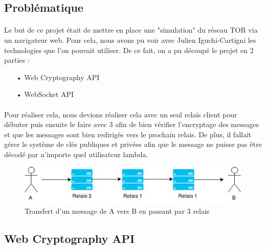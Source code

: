 \documentclass[a4paper,12pt]{report}
\begin{document}
	\subsection{Problématique}
	\paragraph*{}
	Le but de ce projet était de mettre en place une "simulation" du réseau TOR via un navigateur web. Pour cela, nous avons pu voir avec Julien Iguchi-Cartigni les technologies que l'on pouvait utiliser. De ce fait, on a pu découpé le projet en 2 parties : 
	\begin{itemize}
		\item[•] Web Cryptography API
		\item[•] WebSocket API
	\end{itemize}
	\paragraph*{}
	Pour réaliser cela, nous devions réaliser cela avec un seul relais client pour débuter puis ensuite le faire avec 3 afin de bien vérifier l'encryptage des messages et que les messages sont bien redirigés vers le prochain relais. De plus, il fallait gérer le système de clés publiques et privées afin que le message ne puisse pas être décodé par n'importe quel utilisateur lambda.
	\begin{figure}[h] %
		\includegraphics[scale=0.8]{project.jpg}
		\caption{Transfert d'un message de A vers B en passant par 3 relais}
		\label{project}
	\end{figure}
	
	\subsection{Web Cryptography API}
\end{document}
